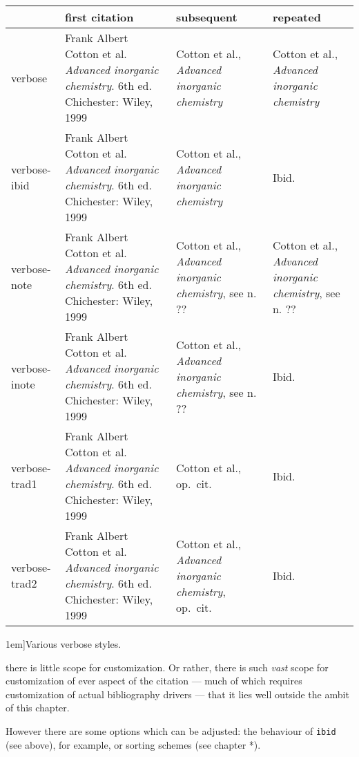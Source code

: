 \begin{table*}[btp]
\small
\begin{tabular}{lp{1.7in}p{1.7in}p{1.7in}}
\toprule
& \textsf{first citation} & \textsf{subsequent} &
\textsf{repeated} \\
\midrule verbose & Frank Albert Cotton et al. \emph{Advanced inorganic
  chemistry}. 6th ed. Chichester: Wiley, 1999 & Cotton et al.,
\emph{Advanced inorganic chemistry} & Cotton et al., \emph{Advanced
  inorganic chemistry}\\
verbose-ibid & Frank Albert Cotton et al. \emph{Advanced inorganic
  chemistry}. 6th ed. Chichester: Wiley, 1999 & Cotton et al.,
\emph{Advanced inorganic chemistry} & Ibid. \\
verbose-note & Frank Albert Cotton et al. \emph{Advanced inorganic
  chemistry}. 6th ed. Chichester: Wiley, 1999 & Cotton et al.,
\emph{Advanced inorganic chemistry}, see n. ?? & Cotton et al.,
\emph{Advanced inorganic chemistry}, see n. ??\\
verbose-inote & Frank Albert Cotton et al. \emph{Advanced inorganic
  chemistry}. 6th ed. Chichester: Wiley, 1999 & Cotton et al.,
\emph{Advanced inorganic chemistry}, see n. ?? & Ibid. \\
verbose-trad1 & Frank Albert Cotton et al. \emph{Advanced inorganic
  chemistry}. 6th ed. Chichester: Wiley, 1999 & Cotton et al.,
op.\ cit. & Ibid. \\
verbose-trad2 & Frank Albert Cotton et al. \emph{Advanced inorganic
  chemistry}. 6th ed. Chichester: Wiley, 1999 & Cotton et al.,
\emph{Advanced inorganic chemistry},
op.\ cit. & Ibid. \\
\bottomrule
\end{tabular}
\caption[][1em]{Various verbose styles.\label{bibliography:examples:verbose}}
\end{table*}

 there is little scope for
customization. Or rather, there is such \emph{vast} scope for
customization of ever aspect of the citation --- much of which
requires customization of actual bibliography drivers --- that it lies
well outside the ambit of this chapter.

However there are some options which can be adjusted: the behaviour of
\verb|ibid| (see above), for example, or sorting schemes (see chapter
*).